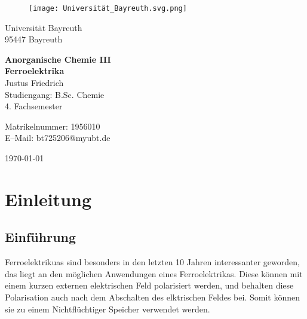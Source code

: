 \documentclass[12pt, a4paper]{article}
\begin{document}
\begin{figure}
    \texttt{[image: Universität\_Bayreuth.svg.png]}
\end{figure}



{\raggedright Universität Bayreuth\\  95447 Bayreuth}


\vspace{5cm}

\begin{center}
{\LARGE\bf{Anorganische Chemie III}} \\  
\vspace{1cm}
{\Large\bf{Ferroelektrika}}\\
\vspace{0.5cm}
{\large Justus Friedrich\\}
{Studiengang: B.Sc. Chemie\\}
{4. Fachsemester}
\end{center}





\thispagestyle{empty}
\begin{center}
{\small Matrikelnummer: 1956010 \\
E–Mail:  bt725206@myubt.de}
\end{center}

\vspace{5cm}

\begin{center}
  \today
\end{center}


\newpage
\tableofcontents
\thispagestyle{empty}


\newpage
\setcounter{page}{1}
\section{Einleitung}



\subsection{Einführung}
Ferroelektrikuas sind besonders in den letzten 10 Jahren interessanter geworden, 
das liegt an den möglichen Anwendungen eines Ferroelektrikas. Diese können mit einem kurzen 
externen elektrischen Feld polarisiert werden, und behalten diese Polarisation auch nach dem Abschalten 
des elktrischen Feldes bei. Somit können sie zu einem Nichtflüchtiger Speicher verwendet werden.\cite{Damjanovic.1998}
\end{document}
